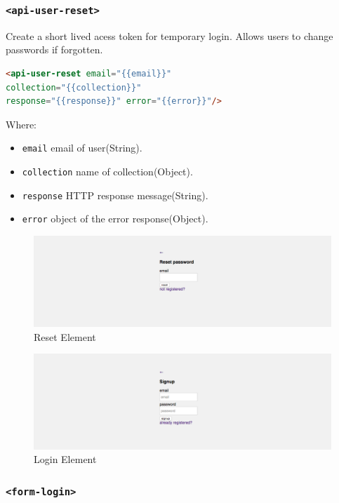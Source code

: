 \subsubsection{\texttt{<api-user-reset>}}

Create a short lived acess token for temporary login. Allows users to change passwords if forgotten.
\begin{lstlisting}[language=html]
<api-user-reset email="{{email}}"
collection="{{collection}}" 
response="{{response}}" error="{{error}}"/>
\end{lstlisting}
Where:
\begin{itemize}
\item \texttt{email} email of user(String).
\item \texttt{collection} name of collection(Object).
\item \texttt{response}	HTTP response message(String).
\item \texttt{error} object of the error response(Object).
\end{itemize}

\begin {figure}[h]
\graphicspath{{images/chapter_USR/}}
\includegraphics[width=\textwidth]{usr3}
\caption{Reset Element}
\end {figure}

\begin {figure}[h]
\graphicspath{{images/chapter_USR/}}
\includegraphics[width=\textwidth]{usr4}
\caption{Login Element}
\end {figure}

\subsubsection{\texttt{<form-login>}}

